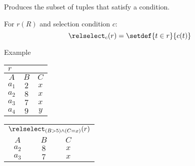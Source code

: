 \newpage
\begin{multicols}{2}
    
    \begin{CheatsheetEntryFrame}


        Produces the subset of tuples that satisfy a condition.
        
        For $r(R)$ and selection condition $c$:
        \begin{equation*}
            \relselect_{c}{(r)} = \setdef{t \in r}{c(t)}
        \end{equation*}

        \SubsectionFrameRemoveSeparation
        \begin{RelAlgSubsection}{Example}
        \begin{center}
            {\footnotesize%
                \begin{tabular}{|ccc|}
                    \multicolumn{3}{l}{\normalsize $r$}
                        \\ \hline
                    \multicolumn{1}{|c}{$A$}
                        & \multicolumn{1}{c}{$B$}
                        & \multicolumn{1}{c|}{$C$}
                        \\ \hline\hline
                    $a_1$ & $2$ & $x$ \\
                    $a_2$ & $8$ & $x$ \\
                    $a_3$ & $7$ & $x$ \\
                    $a_4$ & $9$ & $y$ \\ \hline
                \end{tabular}
                \qquad \qquad
                \begin{tabular}{|ccc|c}
                    \multicolumn{4}{l}{\normalsize $\relselect_{(B>5) \wedge (C=x)}{(r)}$}
                        \\ \cline{1-3}
                    \multicolumn{1}{|c}{$A$}
                        & \multicolumn{1}{c}{$B$}
                        & \multicolumn{1}{c|}{$C$}
                        & \multicolumn{1}{c}{} %
                        \\ \cline{1-3} \cline{1-3}
                    $a_2$ & $8$ & $x$ & \multicolumn{1}{c}{} \\
                    $a_3$ & $7$ & $x$ & \multicolumn{1}{c}{} \\ \cline{1-3}
                \end{tabular}
            }
        \end{center}
        \end{RelAlgSubsection}


\end{CheatsheetEntryFrame}
\end{multicols}
